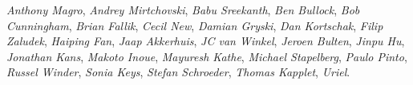 \emph{Anthony Magro},
\emph{Andrey Mirtchovski},
\emph{Babu Sreekanth},
\emph{Ben Bullock},
\emph{Bob Cunningham},
\emph{Brian Fallik},
\emph{Cecil New},
\emph{Damian Gryski},
\emph{Dan Kortschak},
\emph{Filip Zaludek},
\emph{Haiping Fan},
\emph{Jaap Akkerhuis},
\emph{JC van Winkel},
\emph{Jeroen Bulten},
\emph{Jinpu Hu},
\emph{Jonathan Kans},
\emph{Makoto Inoue},
\emph{Mayuresh Kathe},
\emph{Michael Stapelberg},
\emph{Paulo Pinto},
\emph{Russel Winder},
\emph{Sonia Keys},
\emph{Stefan Schroeder},
\emph{Thomas Kapplet},
\emph{Uriel}.
